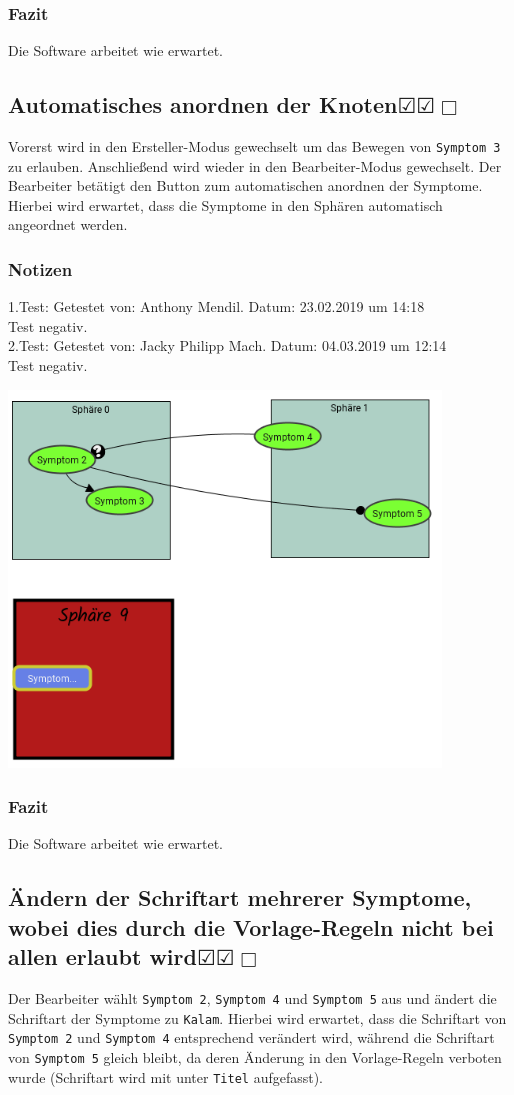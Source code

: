 \documentclass[enabledeprecatedfontcommands]{scrartcl}
\newcommand{\subsectiont}[2]{\subsection[#1]{#1{\normalsize\normalfont #2}}}
\newcommand{\leer}{$\Box$}
\newcommand{\ok}{$\CheckedBox$}
\begin{document}
\subsubsection{Fazit}
Die Software arbeitet wie erwartet.

\subsectiont{Automatisches anordnen der Knoten}{\dotfill\ok\ok\leer}
Vorerst wird in den Ersteller-Modus gewechselt um das Bewegen von \texttt{Symptom 3} zu erlauben. Anschließend wird wieder in den Bearbeiter-Modus gewechselt. Der Bearbeiter betätigt den Button zum automatischen anordnen der Symptome. Hierbei wird erwartet, dass die Symptome in den Sphären automatisch angeordnet werden. 
\subsubsection{Notizen}
1.Test: Getestet von: Anthony Mendil. Datum: 23.02.2019 um 14:18 \\
Test negativ.\\
2.Test: Getestet von: Jacky Philipp Mach. Datum: 04.03.2019 um 12:14 \\
Test negativ.
\begin{center}
\includegraphics[height=10cm]{2_28.PNG}
\end{center}
\subsubsection{Fazit}
Die Software arbeitet wie erwartet.

\subsectiont{Ändern der Schriftart mehrerer Symptome, wobei dies durch die Vorlage-Regeln nicht bei allen erlaubt wird}{\dotfill\ok\ok\leer}
Der Bearbeiter wählt \texttt{Symptom 2}, \texttt{Symptom 4} und \texttt{Symptom 5} aus und ändert die Schriftart der Symptome zu \texttt{Kalam}. Hierbei wird erwartet, dass die Schriftart von  \texttt{Symptom 2} und \texttt{Symptom 4} entsprechend verändert wird, während die Schriftart von \texttt{Symptom 5} gleich bleibt, da deren Änderung in den Vorlage-Regeln verboten wurde (Schriftart wird mit unter \texttt{Titel} aufgefasst).  
\end{document}
